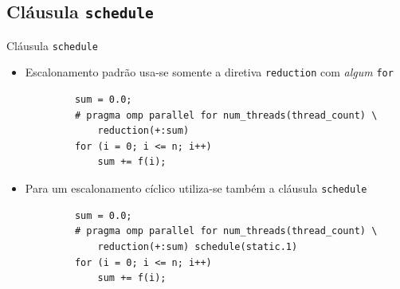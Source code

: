 	\subsection{Cláusula {\tt schedule}}
	\begin{frame}[fragile]{Cláusula {\tt schedule}}
		\begin{itemize}
			\item Escalonamento padrão usa-se somente a diretiva {\tt reduction} com \textit{algum} {\tt for}
		\end{itemize}
		\begin{verbatim}
			sum = 0.0;
			# pragma omp parallel for num_threads(thread_count) \
				reduction(+:sum)		
			for (i = 0; i <= n; i++)
				sum += f(i);
		\end{verbatim}

		\begin{itemize}
			\item Para um escalonamento cíclico utiliza-se também a cláusula {\tt schedule}
		\end{itemize}
		
		\begin{verbatim}
			sum = 0.0;
			# pragma omp parallel for num_threads(thread_count) \
				reduction(+:sum) schedule(static.1)
			for (i = 0; i <= n; i++)
				sum += f(i);
		\end{verbatim}
\end{frame}

